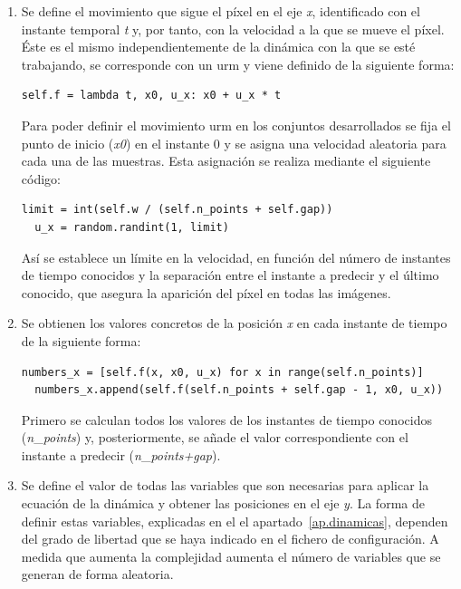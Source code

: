 \begin{enumerate}
  \item Se define el movimiento que sigue el píxel en el eje \textit{x}, identificado con el instante temporal \textit{t} y, por tanto, con la velocidad a la que se mueve el píxel. Éste es el mismo independientemente de la dinámica con la que se esté trabajando, se corresponde con un \acrshort{urm} y viene definido de la siguiente forma:
  \vspace{10pt}
  \begin{lstlisting}[frame=single]
  self.f = lambda t, x0, u_x: x0 + u_x * t
  \end{lstlisting}
  Para poder definir el movimiento \acrshort{urm} en los conjuntos desarrollados se fija el punto de inicio (\textit{x0}) en el instante 0 y se asigna una velocidad aleatoria para cada una de las muestras. Esta asignación se realiza mediante el siguiente código:
  \vspace{10pt}
  \begin{lstlisting}[frame=single]
  limit = int(self.w / (self.n_points + self.gap))
  u_x = random.randint(1, limit)
  \end{lstlisting}
  Así se establece un límite en la velocidad, en función del número de instantes de tiempo conocidos y la separación entre el instante a predecir y el último conocido, que asegura la aparición del píxel en todas las imágenes.
  
  \item Se obtienen los valores concretos de la posición \textit{x} en cada instante de tiempo de la siguiente forma:
  \vspace{10pt}
  \begin{lstlisting}[frame=single]
  numbers_x = [self.f(x, x0, u_x) for x in range(self.n_points)]
  numbers_x.append(self.f(self.n_points + self.gap - 1, x0, u_x))
  \end{lstlisting}
  Primero se calculan todos los valores de los instantes de tiempo conocidos (\textit{n}\_\textit{points}) y, posteriormente, se añade el valor correspondiente con el instante a predecir (\textit{n}\_\textit{points+gap}).
  
  \item Se define el valor de todas las variables que son necesarias para aplicar la ecuación de la dinámica y obtener las posiciones en el eje \textit{y}. La forma de definir estas variables, explicadas en el el apartado~\ref{ap.dinamicas}, dependen del grado de libertad que se haya indicado en el fichero de configuración. A medida que aumenta la complejidad aumenta el número de variables que se generan de forma aleatoria. 
  

\end{enumerate}
